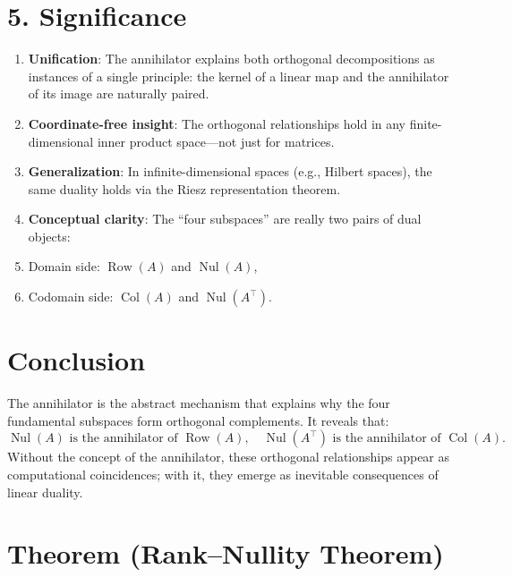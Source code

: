 \documentclass[11pt]{article}
\begin{document}
\section*{5. Significance}

\begin{enumerate}
    \item \textbf{Unification}: The annihilator explains both orthogonal decompositions as instances of a single principle: the kernel of a linear map and the annihilator of its image are naturally paired.
    
    \item \textbf{Coordinate-free insight}: The orthogonal relationships hold in any finite-dimensional inner product space—not just for matrices.
    
    \item \textbf{Generalization}: In infinite-dimensional spaces (e.g., Hilbert spaces), the same duality holds via the Riesz representation theorem.
    
    \item \textbf{Conceptual clarity}: The ``four subspaces'' are really two pairs of dual objects:
    \item Domain side: $ \operatorname{Row}(A) $ and $ \operatorname{Nul}(A) $,
        \item Codomain side: $ \operatorname{Col}(A) $ and $ \operatorname{Nul}(A^\top) $.
\end{enumerate}

\section*{Conclusion}

The annihilator is the abstract mechanism that explains why the four fundamental subspaces form orthogonal complements. It reveals that:
\[
\operatorname{Nul}(A) \text{ is the annihilator of } \operatorname{Row}(A), \quad
\operatorname{Nul}(A^\top) \text{ is the annihilator of } \operatorname{Col}(A).
\]
Without the concept of the annihilator, these orthogonal relationships appear as computational coincidences; with it, they emerge as inevitable consequences of linear duality.












\section*{Theorem (Rank--Nullity Theorem)}
\end{document}
